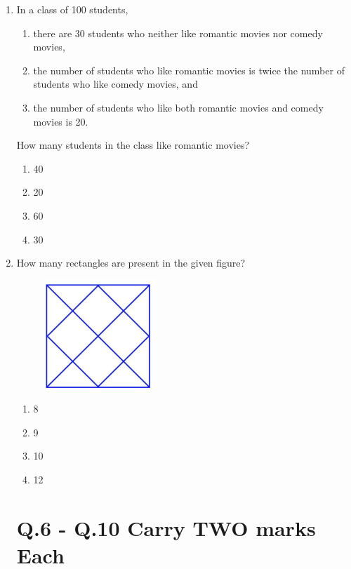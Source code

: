 \documentclass[journal]{IEEEtran}
\begin{document}
\begin{enumerate}
\item 
In a class of 100 students,
\begin{enumerate}
    \item there are 30 students who neither like romantic movies nor comedy movies,
    \item the number of students who like romantic movies is twice the number of students who like comedy movies, and
    \item the number of students who like both romantic movies and comedy movies is 20.
\end{enumerate}

How many students in the class like romantic movies?
\hfill{}

\begin{enumerate}
    \item 40
    \item 20
    \item 60
    \item 30
\end{enumerate}
\hfill{}

\newpage
\item  
How many rectangles are present in the given figure?
\begin{figure}[H]
    \centering
    \includegraphics[width=0.4\textwidth]{Figs/Q5}
    \caption{}
    \label{}
\end{figure}

\begin{enumerate}
    \item 8
    \item 9
    \item 10
    \item 12
\end{enumerate}
\hfill{}

\section*{Q.6 - Q.10 Carry TWO marks Each}


\end{enumerate}
\end{document}
